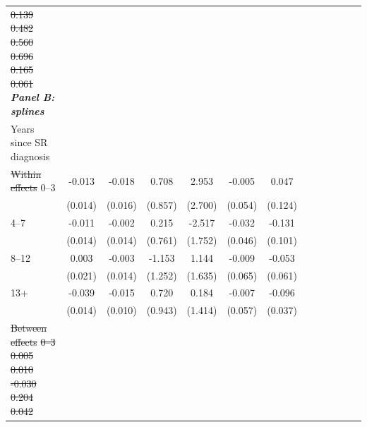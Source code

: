 \documentclass[12pt,english]{article}
\providecommand{\DIFdeltex}[1]{{\protect\color{red}\sout{#1}}}                      %
\providecommand{\DIFdelFL}[1]{\DIFdel{#1}} %
\providecommand{\DIFdelbeginFL}{} %
\providecommand{\DIFdelendFL}{} %
\providecommand{\DIFdel}[1]{\texorpdfstring{\DIFdeltex{#1}}{}} %
\begin{document}
\begin{table}[!ht]
\begin{center}
\begin{adjustbox}{max width=.9\linewidth}
\begin{threeparttable}
{\begin{tabular}{l*{6}{S S}}
\DIFdelFL{0.139         }%
\DIFdelFL{0.482         }%
\DIFdelFL{0.560         }%
\DIFdelFL{0.696         }%
\DIFdelFL{0.165         }%
\DIFdelFL{0.061         }%
\DIFdelendFL \textit{\textbf{Panel B: splines}} &&&&&&\\
						Years since SR diagnosis  &&&&&&\\
						\DIFdelbeginFL \DIFdelFL{Within effects}%
\DIFdelendFL 0--3 &    -0.013         &   -0.018         &    0.708         &    2.953         &   -0.005         &    0.047         \\
						&  (0.014)         &  (0.016)         &  (0.857)         &  (2.700)         &  (0.054)         &  (0.124)         \\
						4--7 &    -0.011         &   -0.002         &    0.215         &   -2.517         &   -0.032         &   -0.131         \\
						&  (0.014)         &  (0.014)         &  (0.761)         &  (1.752)         &  (0.046)         &  (0.101)         \\
						8--12 &    0.003         &   -0.003         &   -1.153         &    1.144         &   -0.009         &   -0.053         \\
						&  (0.021)         &  (0.014)         &  (1.252)         &  (1.635)         &  (0.065)         &  (0.061)         \\
						13+ &    -0.039\sym{***}&   -0.015         &    0.720         &    0.184         &   -0.007         &   -0.096\sym{***}\\
						&  (0.014)         &  (0.010)         &  (0.943)         &  (1.414)         &  (0.057)         &  (0.037)         \\
						\DIFdelbeginFL \DIFdelFL{Between effects}%
\DIFdelFL{0--3 }%
\DIFdelFL{0.005         }%
\DIFdelFL{0.010         }%
\DIFdelFL{-0.030         }%
\DIFdelFL{0.204         }%
\DIFdelFL{0.042}%

\end{tabular}}
\end{threeparttable}
\end{adjustbox}
\end{center}
\end{table}
\end{document}
